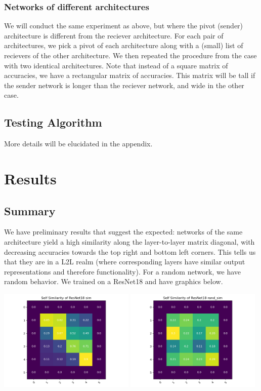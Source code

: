 \documentclass{article} %
\begin{document}
\subsubsection*{Networks of different architectures}
We will conduct the same experiment as above, but where the pivot (sender) architecture is different from the reciever architecture.
For each pair of architectures, we pick a pivot of each architecture along with a (small) list of recievers of the other architecture.
We then repeated the procedure from the case with two identical architectures. Note that instead of a square matrix of accuracies, we
have a rectangular matrix of accuracies. This matrix will be tall if the sender network is longer than the reciever network, and wide
in the other case.

\subsection{Testing Algorithm}
More details will be elucidated in the appendix.

\section{Results}
\subsection{Summary}
We have preliminary results that suggest the expected: networks of the same architecture yield a high similarity
along the layer-to-layer matrix diagonal, with decreasing accuracies towards the top right and bottom left corners. This tells us
that they are in a L2L realm (where corresponding layers have similar output representations and therefore functionality).
For a random network, we have random behavior. We trained on a ResNet18 and have graphics below.
\begin{center}
   \includegraphics[width=6.5cm]{sim.png}
   \includegraphics[width=6.5cm]{rand.png}
\end{center}
\end{document}
